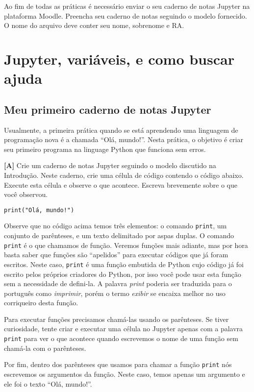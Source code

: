 \documentclass[11pt]{article}
\begin{document}
Ao fim de todas as práticas é necessário enviar o seu caderno de notas Jupyter na plataforma Moodle. Preencha seu caderno de notas seguindo o modelo fornecido. O nome do arquivo deve conter seu nome, sobrenome e RA.

\section{Jupyter, variáveis, e como buscar ajuda}
\label{sec:org9088df7}
\subsection{Meu primeiro caderno de notas Jupyter}
\label{sec:org3e8c1a6}

Usualmente, a primeira prática quando se está aprendendo uma linguagem de programação nova é a chamada ``Olá, mundo!''. Nesta prática, o objetivo é criar seu primeiro programa na linguage Python que funciona sem erros.

\textbf{[A]} Crie um caderno de notas Jupyter seguindo o modelo discutido na Introdução. Neste caderno, crie uma célula de código contendo o código abaixo. Execute esta célula e observe o que acontece. Escreva brevemente sobre o que você observou.

\begin{verbatim}
print("Olá, mundo!")
\end{verbatim}

Observe que no código acima temos três elementos: o comando \texttt{print}, um conjunto de parênteses, e um texto delimitado por aspas duplas. O comando \texttt{print} é o que chamamos de função. Veremos funções mais adiante, mas por hora basta saber que funções são ``apelidos'' para executar códigos que já foram escritos. Neste caso, \texttt{print} é uma função embutida de Python cujo código já foi escrito pelos próprios criadores do Python, por isso você pode usar esta função sem a necessidade de defini-la. A palavra \emph{print} poderia ser traduzida para o português como \emph{imprimir}, porém o termo \emph{exibir} se encaixa melhor no uso corriqueiro desta função.

Para executar funções precisamos chamá-las usando os parênteses. Se tiver curiosidade, tente criar e executar uma célula no Jupyter apenas com a palavra \texttt{print} para ver o que acontece quando escrevemos o nome de uma função sem chamá-la com o parênteses.

Por fim, dentro dos parênteses que usamos para chamar a função \texttt{print} nós escrevemos os argumentos da função. Neste caso, temos apenas um argumento e ele foi o texto ``Olá, mundo!''.
\end{document}
